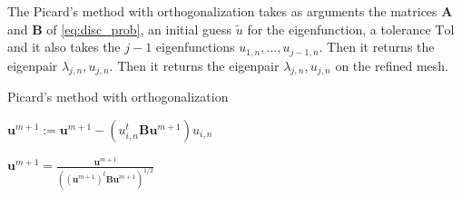 \documentclass[preprint,12pt]{elsarticle}
\begin{document}
The Picard's method with orthogonalization takes as arguments the matrices $\mathbf{A}$ and $\mathbf{B}$ of \eqref{eq:disc_prob}, an initial guess $\tilde u$ for the eigenfunction, a tolerance $\mathrm{Tol}$ and it also takes the $j-1$ eigenfunctions $u_{1,n},\dots,u_{j-1,n}$.
Then it returns the eigenpair $\lambda_{j,n},u_{j,n}$. 
Then it returns the eigenpair $\lambda_{j,n},u_{j,n}$ on the refined mesh.





\begin{algorithm}[H] \caption{Picard's method with orthogonalization} \label{alg:picard_ortho} 
\begin{algorithmic}

    

\REPEAT



\STATE $\mathbf{u}^{m+1}:=\mathbf{u}^{m+1}-(u_{i,n}^t\mathbf{B}\mathbf{u}^{m+1})u_{i,n}$
\ENDFOR


\STATE $\displaystyle \mathbf{u}^{m+1}=\frac{\mathbf{u}^{m+1}}{((\mathbf{u}^{m+1})^t\mathbf{B}\mathbf{u}^{m+1})^{1/2}}$
\end{algorithmic}
\end{algorithm}
\end{document}
